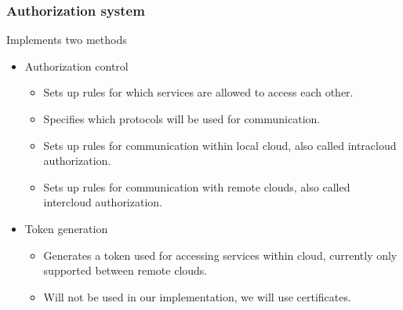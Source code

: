 \begin{frame}  
    \frametitle{Authorization system}
    
    Implements two methods
    
    \begin{itemize}
        \item Authorization control
        \begin{itemize}
            \item Sets up rules for which services are allowed to access each other.
            \item Specifies which protocols will be used for communication.
            \item Sets up rules for communication within local cloud, also called intracloud authorization.
            \item Sets up rules for communication with remote clouds, also called intercloud authorization.
        \end{itemize}
        \item Token generation
            \begin{itemize}
                \item Generates a token used for accessing services within cloud, currently only supported between remote clouds. 
                \item Will not be used in our implementation, we will use certificates.
            \end{itemize}
            
    \end{itemize}
    
\end{frame}